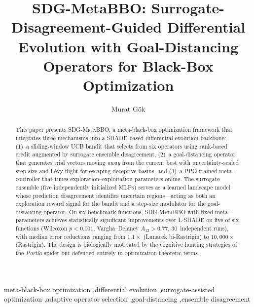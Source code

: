\documentclass[preprint,12pt,authoryear]{elsarticle}
\newcommand{\sdg}{\textsc{SDG-MetaBBO}}
\begin{document}
\begin{frontmatter}

\title{SDG-MetaBBO: Surrogate-Disagreement-Guided Differential Evolution with Goal-Distancing Operators for Black-Box Optimization}

\author[yalova]{Murat G\"ok}


\begin{abstract}
This paper presents \sdg{}, a meta-black-box optimization framework that integrates three mechanisms into a SHADE-based differential evolution backbone: (1)~a sliding-window UCB bandit that selects from six operators using rank-based credit augmented by surrogate ensemble disagreement, (2)~a goal-distancing operator that generates trial vectors moving \emph{away} from the current best with uncertainty-scaled step size and L\'evy flight for escaping deceptive basins, and (3)~a PPO-trained meta-controller that tunes exploration--exploitation parameters online. The surrogate ensemble (five independently initialized MLPs) serves as a learned landscape model whose prediction disagreement identifies uncertain regions---acting as both an exploration reward signal for the bandit and a step-size modulator for the goal-distancing operator. On six benchmark functions, \sdg{} with fixed meta-parameters achieves statistically significant improvements over L-SHADE on five of six functions (Wilcoxon $p < 0.001$, Vargha--Delaney $A_{12} > 0.77$, 30~independent runs), with median error reductions ranging from $1.1\times$ (Lunacek bi-Rastrigin) to $10{,}000\times$ (Rastrigin). The design is biologically motivated by the cognitive hunting strategies of the \emph{Portia} spider but defended entirely in optimization-theoretic terms.
\end{abstract}

\begin{keyword}
meta-black-box optimization \sep differential evolution \sep surrogate-assisted optimization \sep adaptive operator selection \sep goal-distancing \sep ensemble disagreement
\end{keyword}

\end{frontmatter}
\end{document}
